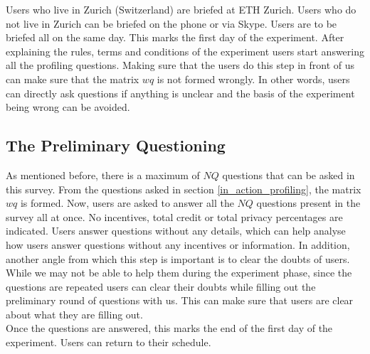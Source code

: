 Users who live in Zurich (Switzerland) are briefed at ETH Zurich. Users who do not live in Zurich
can be briefed on the phone or via Skype. Users are to be briefed all on the same day. This marks the first day of the experiment.
After explaining the rules, terms and conditions of the experiment users start answering all the profiling questions. Making sure that the users do this
step in front of us can make sure that the matrix $wq$ is not formed wrongly. In other words, users can directly ask questions if anything is unclear and the basis of the experiment
being wrong can be avoided.


\subsection{The Preliminary Questioning}
As mentioned before, there is a maximum of $NQ$ questions that can be asked in this survey. From the questions asked in section \ref{in_action_profiling}, the matrix $wq$ is formed.
Now, users are asked to answer all the $NQ$ questions present in the survey all at once. No incentives, total credit or total privacy percentages are indicated. Users answer questions
without any details, which can help analyse how users answer questions without any incentives or information. In addition, another angle from which this
step is important is to clear the doubts of users. While we may not be able to help them during the experiment phase, since the questions
are repeated users can clear their doubts while filling out the preliminary round of questions with us. This can make sure that users are clear about what they are filling out.\\
Once the questions are answered, this marks the end of the first day of the experiment. Users can return to their schedule.

